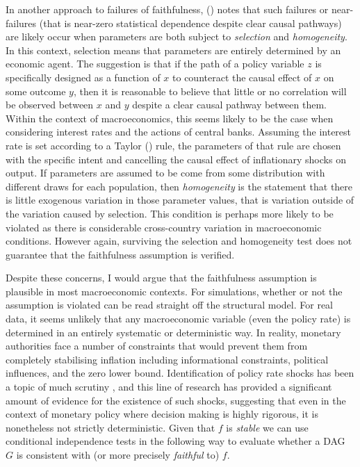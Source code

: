 \documentclass{article}
\begin{document}
In another approach to failures of faithfulness, \citeauthor{steel2006homogeneity} (\citeyear{steel2006homogeneity}) notes that such failures or near-failures (that is near-zero statistical dependence despite clear causal pathways) are likely occur when parameters are both subject to \textit{selection} and \textit{homogeneity}. In this context, selection means that parameters are entirely determined by an economic agent. The suggestion is that if the path of a policy variable $z$ is specifically designed as a function of $x$ to counteract the causal effect of $x$ on some outcome $y$, then it is reasonable to believe that little or no correlation will be observed between $x$ and $y$ despite a clear causal pathway between them. Within the context of macroeconomics, this seems likely to be the case when considering interest rates and the actions of central banks. Assuming the interest rate is set according to a Taylor (\citeyear{taylor1993discretion}) rule, the parameters of that rule are chosen with the specific intent and cancelling the causal effect of inflationary shocks on output. If parameters are assumed to be come from some distribution with different draws for each population, then \textit{homogeneity} is the statement that there is little exogenous variation in those parameter values, that is variation outside of the variation caused by selection. This condition is perhaps more likely to be violated as there is considerable cross-country variation in macroeconomic conditions. However again, surviving the selection and homogeneity test does not guarantee that the faithfulness assumption is verified.

Despite these concerns, I would argue that the faithfulness assumption is plausible in most macroeconomic contexts. For simulations, whether or not the assumption is violated can be read straight off the structural model. For real data, it seems unlikely that any macroeconomic variable (even the policy rate) is determined in an entirely systematic or deterministic way. In reality, monetary authorities face a number of constraints that would prevent them from completely stabilising inflation including informational constraints, political influences, and the zero lower bound. Identification of policy rate shocks has been a topic of much scrutiny \parencite{ramey2016handbook}, and this line of research has provided a significant amount of evidence for the existence of such shocks, suggesting that even in the context of monetary policy where decision making is highly rigorous, it is nonetheless not strictly deterministic. Given that $f$ is \textit{stable} we can use conditional independence tests in the following way to evaluate whether a DAG $G$ is consistent with (or more precisely \textit{faithful} to) $f$.
\end{document}
